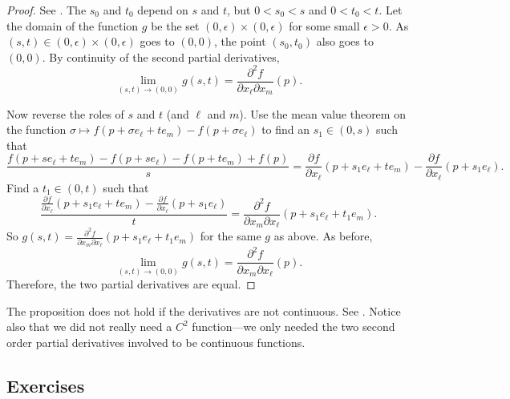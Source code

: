 \begin{proof}
See .
The $s_0$ and $t_0$ depend on $s$ and $t$,
but $0 < s_0 < s$ and
$0 < t_0 < t$.
Let the domain of the function $g$ be the set $(0,\epsilon) \times
(0,\epsilon)$ for some small $\epsilon > 0$.
As $(s,t) \in (0,\epsilon) \times (0,\epsilon)$ goes to $(0,0)$,
the point
$(s_0,t_0)$ also goes to $(0,0)$.
By continuity of the second partial derivatives,
\begin{equation*}
\lim_{(s,t) \to (0,0)} g(s,t) = 
\frac{\partial^2 f}{\partial x_{\ell} \partial x_m}(p) .
\end{equation*}

Now reverse the roles of $s$ and $t$ (and $\ell$ and $m$).
Use the mean value theorem on
the function $\sigma \mapsto f(p+\sigma e_{\ell} + te_m)-f(p + \sigma
e_{\ell})$ to
find an $s_1 \in (0,s)$ such that
\begin{equation*}
\frac{f(p+ se_{\ell} + te_m )- f(p+s e_{\ell}) - f(p+t e_m)+f(p)}{s}
=
\frac{\partial f}{\partial x_{\ell}}(p + s_1 e_{\ell} + t e_m)
-
\frac{\partial f}{\partial x_{\ell}}(p + s_1 e_{\ell}) .
\end{equation*}
Find a $t_1 \in (0,t)$ such that
\begin{equation*}
\frac{\frac{\partial f}{\partial x_{\ell}}(p + s_1 e_{\ell} + t e_m)
-
\frac{\partial f}{\partial x_{\ell}}(p + s_1 e_{\ell})}{t}
=
\frac{\partial^2 f}{\partial x_m \partial x_{\ell}}(p + s_1 e_{\ell} + t_1 e_m) .
\end{equation*}
So $g(s,t) = \frac{\partial^2 f}{\partial x_m \partial
x_{\ell}}(p + s_1 e_{\ell} + t_1 e_m)$ for the same $g$ as above.
As before,
\begin{equation*}
\lim_{(s,t) \to (0,0)} g(s,t) = 
\frac{\partial^2 f}{\partial x_m \partial x_{\ell}}(p) .
\end{equation*}
Therefore, the two partial derivatives are equal.
\end{proof}

The proposition does not hold if the derivatives are not
continuous.  See .
Notice also that we did not really need a $C^2$ function---we only needed the
two second order partial derivatives involved to be continuous functions.

\subsection{Exercises}

